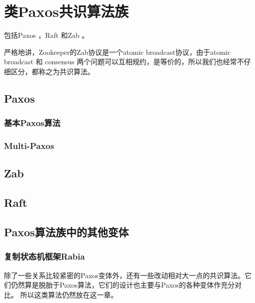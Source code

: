 \chapter{类Paxos共识算法族}


包括Paxos \cite{Lamport01}，Raft \cite{Ongaro14}和Zab \cite{Hunt10, Junqueira11}。

严格地讲，Zookeeper的Zab协议是一个atomic broadcast协议，由于atomic broadcast 和 consensus 两个问题可以互相规约，是等价的\cite{Chandra96unreliable}，所以我们也经常不仔细区分，都称之为共识算法。

\section{Paxos} \label{}

\subsection{基本Paxos算法}

\subsection{Multi-Paxos}

\section{Zab} \label{sec:zab}

\section{Raft} \label{sec:raft}


\section{Paxos算法族中的其他变体}

\subsection{复制状态机框架Rabia} \label{Sec_Rabia}

除了一些关系比较紧密的Paxos变体外，还有一些改动相对大一点的共识算法。它们仍然算是脱胎于Paxos算法，它们的设计也主要与Paxos的各种变体作充分对比。
所以这类算法仍然放在这一章。

